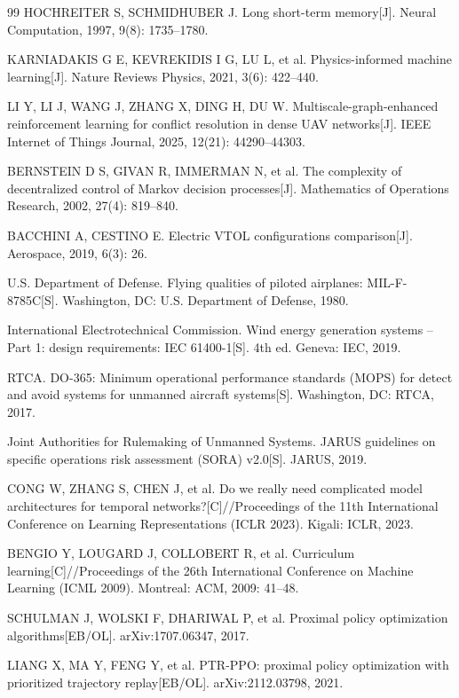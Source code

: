 \documentclass[12pt,a4paper,UTF8]{ctexart}
\begin{document}
\begin{thebibliography}{99}
 HOCHREITER S, SCHMIDHUBER J. Long short-term memory[J]. Neural Computation, 1997, 9(8): 1735--1780.

 KARNIADAKIS G E, KEVREKIDIS I G, LU L, et al. Physics-informed machine learning[J]. Nature Reviews Physics, 2021, 3(6): 422--440.

 LI Y, LI J, WANG J, ZHANG X, DING H, DU W. Multiscale-graph-enhanced reinforcement learning for conflict resolution in dense UAV networks[J]. IEEE Internet of Things Journal, 2025, 12(21): 44290--44303.

 BERNSTEIN D S, GIVAN R, IMMERMAN N, et al. The complexity of decentralized control of Markov decision processes[J]. Mathematics of Operations Research, 2002, 27(4): 819--840.

 BACCHINI A, CESTINO E. Electric VTOL configurations comparison[J]. Aerospace, 2019, 6(3): 26.

 U.S. Department of Defense. Flying qualities of piloted airplanes: MIL-F-8785C[S]. Washington, DC: U.S. Department of Defense, 1980.

 International Electrotechnical Commission. Wind energy generation systems -- Part 1: design requirements: IEC 61400-1[S]. 4th ed. Geneva: IEC, 2019.

 RTCA. DO-365: Minimum operational performance standards (MOPS) for detect and avoid systems for unmanned aircraft systems[S]. Washington, DC: RTCA, 2017.

 Joint Authorities for Rulemaking of Unmanned Systems. JARUS guidelines on specific operations risk assessment (SORA) v2.0[S]. JARUS, 2019.

 CONG W, ZHANG S, CHEN J, et al. Do we really need complicated model architectures for temporal networks?[C]//Proceedings of the 11th International Conference on Learning Representations (ICLR 2023). Kigali: ICLR, 2023.

 BENGIO Y, LOUGARD J, COLLOBERT R, et al. Curriculum learning[C]//Proceedings of the 26th International Conference on Machine Learning (ICML 2009). Montreal: ACM, 2009: 41--48.

 SCHULMAN J, WOLSKI F, DHARIWAL P, et al. Proximal policy optimization algorithms[EB/OL]. arXiv:1707.06347, 2017.

 LIANG X, MA Y, FENG Y, et al. PTR-PPO: proximal policy optimization with prioritized trajectory replay[EB/OL]. arXiv:2112.03798, 2021.


\end{thebibliography}
\end{document}
